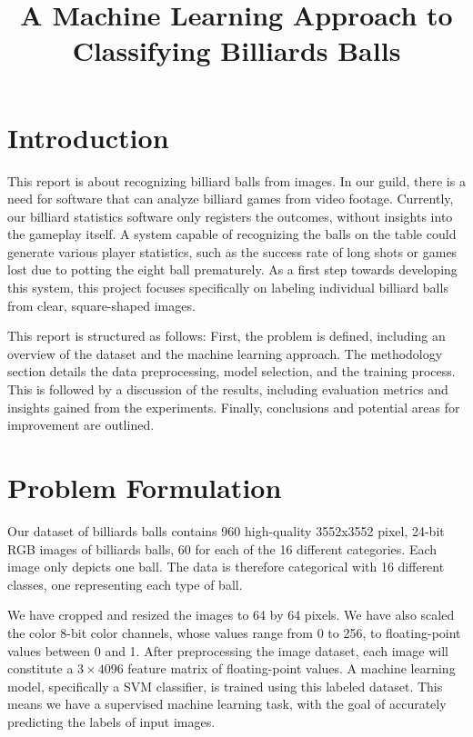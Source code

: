 \documentclass{article}
\begin{document}

\title{A Machine Learning Approach to Classifying Billiards Balls}
\maketitle

\section{Introduction} %
This report is about recognizing billiard balls from images. In our guild, there is a need for software that can analyze billiard games from video footage. Currently, our billiard statistics software only registers the outcomes, without insights into the gameplay itself. A system capable of recognizing the balls on the table could generate various player statistics, such as the success rate of long shots or games lost due to potting the eight ball prematurely. As a first step towards developing this system, this project focuses specifically on labeling individual billiard balls from clear, square-shaped images.

This report is structured as follows: First, the problem is defined, including an overview of the dataset and the machine learning approach. The methodology section details the data preprocessing, model selection, and the training process. This is followed by a discussion of the results, including evaluation metrics and insights gained from the experiments. Finally, conclusions and potential areas for improvement are outlined.



\section{Problem Formulation}
\label{sec:problem_formulation}
Our dataset of billiards balls contains 960 high-quality 3552x3552 pixel, 24-bit RGB images of billiards balls, 60 for each of the 16 different categories. Each image only depicts one ball. The data is therefore categorical with 16 different classes, one representing each type of ball.


We have cropped and resized the images to 64 by 64 pixels. We have also scaled the color 8-bit color channels, whose values range from 0 to 256, to floating-point values between 0 and 1. After preprocessing the image dataset, each image will constitute a $3\times 4096$ feature matrix of floating-point values. A machine learning model, specifically a SVM classifier, is trained using this labeled dataset. This means we have a supervised machine learning task, with the goal of accurately predicting the labels of input images. 
\end{document}
